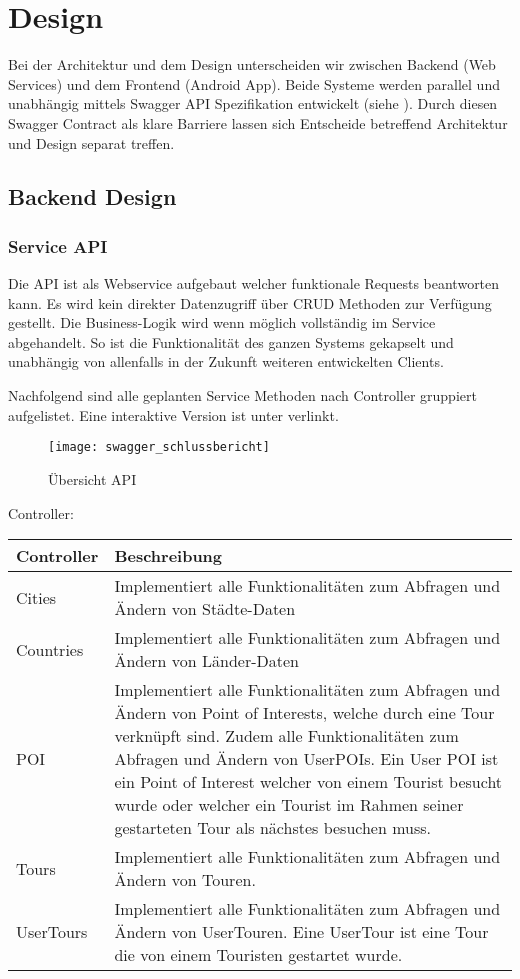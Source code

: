 \section{Design}\label{design}
Bei der Architektur und dem Design unterscheiden wir zwischen Backend
(Web Services) und dem Frontend (Android App). Beide Systeme werden parallel und
unabhängig mittels Swagger API Spezifikation entwickelt (siehe ).
Durch diesen Swagger Contract als klare Barriere lassen sich Entscheide betreffend
Architektur und Design separat treffen.

\subsection{Backend Design}\label{backend-design}
\subsubsection{Service API}\label{service-api}
Die API ist als Webservice aufgebaut welcher funktionale Requests beantworten kann. Es wird kein direkter Datenzugriff
\"uber CRUD Methoden zur Verf\"ugung gestellt. Die Business-Logik wird wenn m\"oglich vollst\"andig im Service
abgehandelt. So ist die Funktionalit\"at des ganzen Systems gekapselt und unabh\"angig von allenfalls in der Zukunft
weiteren entwickelten Clients.

Nachfolgend sind alle geplanten Service Methoden nach Controller gruppiert aufgelistet. Eine
interaktive Version ist unter  verlinkt.

\begin{figure}
  \centering
  \texttt{[image: swagger\_schlussbericht]}
  \caption{Übersicht API}
\end{figure}

\newpage
Controller:

\begin{longtabu} to \textwidth { | l | X[l] | }
\hline
\textbf{Controller} & \textbf{Beschreibung} \\
\hline
\endhead

Cities & Implementiert alle Funktionalit\"aten zum Abfragen und \"Andern von
  St\"adte-Daten\\ \hline
Countries & Implementiert alle Funktionalit\"aten zum Abfragen und \"Andern von
  L\"ander-Daten\\ \hline
POI & Implementiert alle Funktionalit\"aten zum Abfragen und \"Andern von Point of
Interests, welche durch eine Tour verkn\"upft sind. Zudem alle Funktionalit\"aten zum Abfragen und \"Andern von UserPOIs.
  Ein User POI ist ein Point of Interest welcher von einem Tourist besucht wurde oder
  welcher ein Tourist im Rahmen seiner gestarteten Tour als n\"achstes besuchen muss.\\\hline
Tours & Implementiert alle Funktionalit\"aten zum Abfragen und \"Andern von Touren.\\\hline
UserTours & Implementiert alle Funktionalitäten zum Abfragen und Ändern von UserTouren. Eine UserTour ist eine Tour die von einem Touristen gestartet wurde.\\\hline
\end{longtabu}


